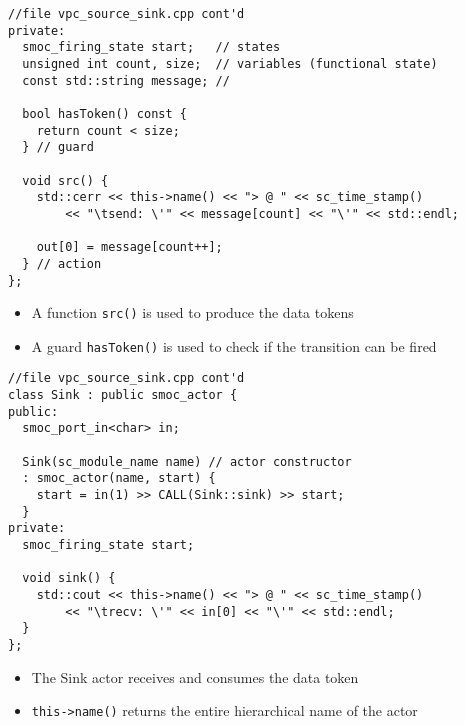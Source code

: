 \begin{frame}[fragile=singleslide]
\begin{lstlisting}
//file vpc_source_sink.cpp cont'd
private:
  smoc_firing_state start;   // states
  unsigned int count, size;  // variables (functional state)
  const std::string message; //

  bool hasToken() const {
    return count < size;
  } // guard

  void src() {
    std::cerr << this->name() << "> @ " << sc_time_stamp()
        << "\tsend: \'" << message[count] << "\'" << std::endl;

    out[0] = message[count++];
  } // action
};
\end{lstlisting}
\begin{itemize}
\item A function \lstinline!src()! is used to produce the data tokens
\item A guard \lstinline!hasToken()! is used to check if the transition can be fired
\end{itemize}
\end{frame}


\begin{frame}[fragile=singleslide]
\begin{lstlisting}
//file vpc_source_sink.cpp cont'd
class Sink : public smoc_actor {
public:
  smoc_port_in<char> in;

  Sink(sc_module_name name) // actor constructor
  : smoc_actor(name, start) {
    start = in(1) >> CALL(Sink::sink) >> start;
  }
private:
  smoc_firing_state start;

  void sink() {
    std::cout << this->name() << "> @ " << sc_time_stamp()
        << "\trecv: \'" << in[0] << "\'" << std::endl;
  }
};
\end{lstlisting}
\begin{itemize}
\item The Sink actor receives and consumes the data token
\item \lstinline!this->name()! returns the entire hierarchical name of the actor
\end{itemize}
\end{frame}


